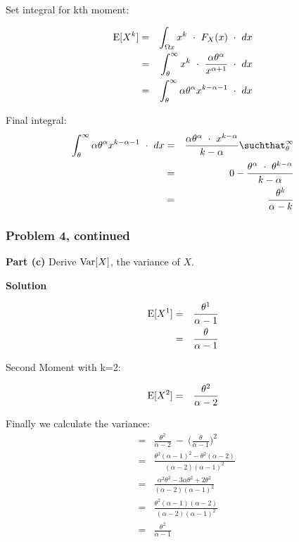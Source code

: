 \documentclass[12pt]{article}
\theoremstyle{definition}
\begin{document}
Set integral for kth moment:

\begin{eqnarray*}
\hbox{E}[X^k] & = & \int_{\Omega x} x^k \ \cdot \ F_X(x) \ \cdot \ dx \\
& = & \int_ \theta ^ \infty x^k \ \cdot \ \frac{\alpha \theta^\alpha}{x^{\alpha+1}} \ \cdot \ dx \\
& = & \int_ \theta ^ \infty \alpha \theta^\alpha x^{k-\alpha-1} \ \cdot \ dx \\
\end{eqnarray*}

Final integral:
\begin{eqnarray*}
\int_ \theta ^ \infty \alpha \theta^\alpha x^{k-\alpha-1} \ \cdot \ dx  & = & \frac{\alpha\theta^\alpha \ \cdot \ x^{k-\alpha}}{k-\alpha} \suchthat_\theta^\infty \\
& = & 0 - \frac{\theta^\alpha \ \cdot \ \theta^{k-\alpha}}{k-\alpha} \\
& = & \frac{\theta^k}{\alpha - k}
\end{eqnarray*}

\newpage
\subsubsection*{Problem 4, continued}

\noindent
{\bf Part (c)} Derive $\hbox{Var}[X]$, the variance of $X$.

\bigskip
\noindent
{\bf Solution}

\begin{eqnarray*}
\hbox{E}[X^1] & = & \frac{\theta^1}{\alpha - 1} \\
& = & \frac{\theta}{\alpha - 1} \\
\end{eqnarray*}

Second Moment with k=2:

\begin{eqnarray*}
\hbox{E}[X^2] & = & \frac{\theta^2}{\alpha - 2} \\
\end{eqnarray*}

Finally we calculate the variance:
\begin{eqnarray*}
& = & \frac{\theta^2}{\alpha - 2} \ - \ \Bigg( \frac{\theta}{\alpha - 1} \Bigg)^2 \\
& = & \frac{\theta^2(\alpha - 1)^2 - \theta^2(\alpha - 2)}{(\alpha - 2)(\alpha -1)^2} \\
& = & \frac{\alpha^2 \theta^2 - 3\alpha\theta^2 + 2\theta^2}{(\alpha - 2)(\alpha -1)^2} \\
& = & \frac{\theta^2(\alpha-1)(\alpha-2)}{(\alpha - 2)(\alpha -1)^2}\\
& = & \frac{\theta^2}{\alpha - 1} \\
\end{eqnarray*}
\end{document}
